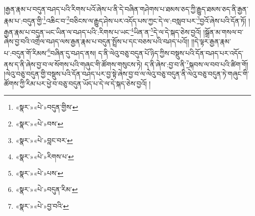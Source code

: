 །རྒྱན་རྣམ་པ་བདུན་བཤད་པའི་རིགས་པའོ་ཞེས་པ་ནི་དེ་བཞིན་གཤེགས་པ་ཐམས་ཅད་ཀྱི་རྒྱུད་ཐམས་ཅད་ནི་རྒྱན་རྣམ་པ་:བདུན་གྱི་\footnote{«སྣར་»«པེ་»བདུན་གྱིས་}འཆིང་བ་\footnote{«སྣར་»«པེ་»བས་}བཅིངས་ལ་རྒྱུད་ཤེས་པར་འདོད་པས་ཀྱང་དེ་ལ་:བསླབ་པར་\footnote{«སྣར་»«པེ་»བླང་བར་}བྱའོ་ཞེས་པའི་དོན་ཏོ། །རྒྱན་རྣམ་པ་བདུན་ཡང་ཡིན་ལ་བཤད་པའི་:རིགས་པ་ཡང་\footnote{«སྣར་»«པེ་»རིགས་པ་}ཡིན་ན་\footnote{«སྣར་»«པེ་»པས་}དེ་ལ་དེ་སྐད་ཅེས་བྱའོ། །སྒྲོན་མ་གསལ་བ་ཞེས་བྱ་བའི་འགྲེལ་བཤད་ལས་རྒྱན་རྣམ་པ་བདུན་སྤྲོས་པ་དང་བཅས་པའི་བཤད་པའོ།། །།དེ་ལྟར་རྒྱན་རྣམ་པ་:བདུན་གོ་རིམས་\footnote{«སྣར་»«པེ་»བདུན་རིམ་}བཞིན་དུ་བཤད་ནས། ད་ནི་ལེའུ་བཅུ་བདུན་པོ་ཉིད་ཀྱིས་བསྡུས་པའི་དོན་བཤད་པར་འདོད་ནས་ད་ནི་ཞེས་བྱ་བ་ལ་སོགས་པའི་གཞུང་གི་ཚོགས་གསུངས་ཏེ། ད་ནི་ཞེས་:བྱ་བ་ནི་\footnote{«སྣར་»«པེ་»བྱ་བའི་}སྐབས་ལ་བབ་པའི་ཚིག་གོ། །ལེའུ་བཅུ་བདུན་གྱི་བསྡུས་པའི་དོན་བཤད་པར་བྱ་སྟེ་ཞེས་བྱ་བ་ལ་ལེའུ་བཅུ་བདུན་ནི་ལེའུ་བཅུ་བདུན་ཏེ་གཞུང་གི་ཚོགས་ཀྱི་རིམ་པར་ཕྱེ་བ་བཅུ་བདུན་ཡོད་པ་དེ་ལ་དེ་སྐད་ཅེས་བྱའོ། །
